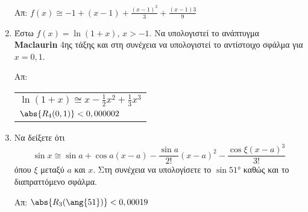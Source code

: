 \begin{enumerate}
    \hfill Απ: $f(x) \cong -1 + (x-1) + \frac{(x-1)^{2}}{3} +
    \frac{(x-1){3}}{9}$


  \item Έστω $ f(x) = \ln{(1+x)} $, $ x>-1 $. Να υπολογιστεί το ανάπτυγμα
    \textbf{Maclaurin} 4ης τάξης και στη συνέχεια να υπολογιστεί το αντίστοιχο 
    σφάλμα για $ x = 0,1 $.

    \hfill Απ: \begin{tabular}{l}
      $ \ln(1+x) \cong x - \frac{1}{2} x^{2} + \frac{1}{3}x^{3} $ \\
      $ \abs{R_{4}(0,1)} < 0,000002$	
    \end{tabular}


  \item Να δείξετε ότι 
    \[
      \sin{x} \cong \sin{a} + \cos{a} (x-a) - \frac{\sin{a}}{2!} (x-a)^{2} -
      \frac{\cos{\xi} (x-a)^{3}}{3!}
    \]
    όπου $\xi$ μεταξύ $a$ και $x$. Στη συνέχεια να υπολογίσετε το $
    \sin{\ang{51}}$ καθώς και το διαπραττόμενο σφάλμα.

    \hfill Απ: $ \abs{R_{3}(\ang{51})} < 0,00019 $


\end{enumerate}



